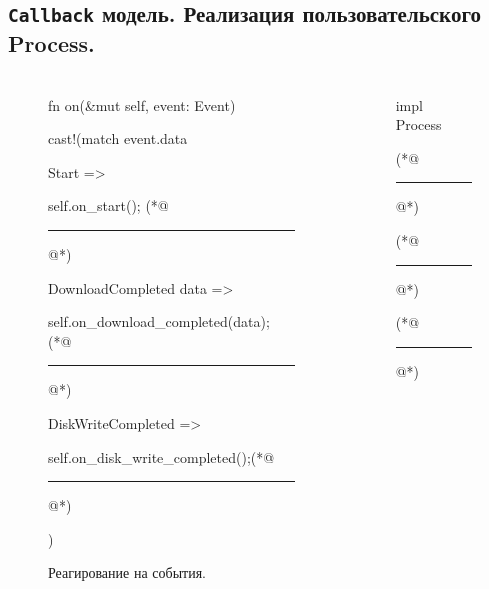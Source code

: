 \documentclass[t]{beamer}  %
\begin{document}
	\subsection{\texttt{Callback} модель. Реализация пользовательского Process.}
	\begin{frame}[fragile]
		\frametitle{\insertsection} 
		\framesubtitle{\insertsubsection}
		\begin{columns}[c] 
			\begin{column}{0.8\textwidth} %
		\begin{figure}
			\footnotesize
			\centering
			\begin{rustcode}[escapeinside={(*@}{@*)}]
fn on(&mut self, event: Event) {
  cast!(match event.data {
    Start {} => {
      self.on_start(); (*@\textcolor{blue}{\rule{1em}{1em}}@*)
    }
    DownloadCompleted {data} => {
      self.on_download_completed(data); (*@\textcolor{red}{\rule{1em}{1em}}@*)
    }
    DiskWriteCompleted => {
      self.on_disk_write_completed();(*@\textcolor{green}{\rule{1em}{1em}}@*)
    }
  })
}
			\end{rustcode}
			\caption*{Реагирование на события.}
		\end{figure}

	\end{column}
	
	\begin{column}{0.24\textwidth}
		\begin{figure}
			\scriptsize
			\centering
			\begin{rustcode}[escapeinside={(*@}{@*)}]
impl Process{
    (*@\textcolor{red}{\rule{1.5em}{1.5em}}@*)

    (*@\textcolor{blue}{\rule{1.5em}{1.5em}}@*)

    (*@\textcolor{green}{\rule{1.5em}{1.5em}}@*)
}
			\end{rustcode}
		\end{figure}
	\end{column}
	\end{columns}

	\end{frame}
\end{document}
